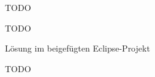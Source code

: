 \documentclass[12pt]{scrartcl}
\begin{document}

\exercise{}
TODO

\exercise{}
TODO

\exercise{}
Lösung im beigefügten Eclipse-Projekt

\exercise{}
TODO



\end{document}
